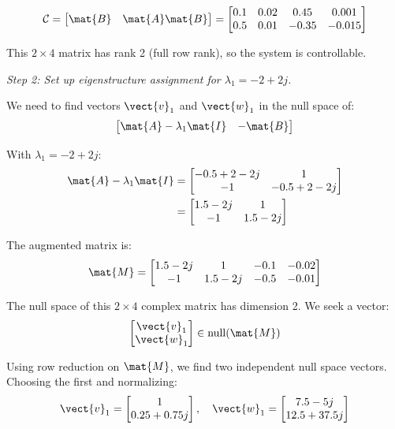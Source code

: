 \begin{equation}
\mathcal{C} = \begin{bmatrix} \mat{B} & \mat{A}\mat{B} \end{bmatrix} =
\begin{bmatrix} 0.1 & 0.02 & 0.45 & 0.001 \\ 0.5 & 0.01 & -0.35 & -0.015 \end{bmatrix}
\end{equation}

This $2 \times 4$ matrix has rank 2 (full row rank), so the system is controllable.

\textit{Step 2: Set up eigenstructure assignment for $\lambda_1 = -2 + 2j$.}

We need to find vectors $\vect{v}_1$ and $\vect{w}_1$ in the null space of:
\begin{equation}
\begin{bmatrix} \mat{A} - \lambda_1\mat{I} & -\mat{B} \end{bmatrix}
\end{equation}

With $\lambda_1 = -2 + 2j$:
\begin{align}
\mat{A} - \lambda_1\mat{I} &= \begin{bmatrix} -0.5+2-2j & 1 \\ -1 & -0.5+2-2j \end{bmatrix} \nonumber \\
&= \begin{bmatrix} 1.5-2j & 1 \\ -1 & 1.5-2j \end{bmatrix}
\end{align}

The augmented matrix is:
\begin{equation}
\mat{M} = \begin{bmatrix} 1.5-2j & 1 & -0.1 & -0.02 \\ -1 & 1.5-2j & -0.5 & -0.01 \end{bmatrix}
\end{equation}

The null space of this $2 \times 4$ complex matrix has dimension 2. We seek a vector:
\begin{equation}
\begin{bmatrix} \vect{v}_1 \\ \vect{w}_1 \end{bmatrix} \in \text{null}(\mat{M})
\end{equation}

Using row reduction on $\mat{M}$, we find two independent null space vectors. Choosing the first and normalizing:
\begin{equation}
\vect{v}_1 = \begin{bmatrix} 1 \\ 0.25 + 0.75j \end{bmatrix}, \quad
\vect{w}_1 = \begin{bmatrix} 7.5 - 5j \\ 12.5 + 37.5j \end{bmatrix}
\end{equation}

